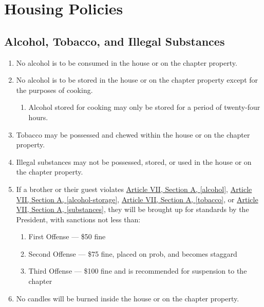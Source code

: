\chapter{Housing Policies}

\section{Alcohol, Tobacco, and Illegal Substances}

	\begin{enumerate}
		\item No alcohol is to be consumed in the house or on the chapter property. \label{alcohol}

		\item No alcohol is to be stored in the house or on the chapter property except for the purposes of cooking. \label{alcohol-storage}
			\begin{enumerate}
				\item Alcohol stored for cooking may only be stored for a period of twenty-four hours.
			\end{enumerate}

		\item Tobacco may be possessed and chewed within the house or on the chapter property. \label{tobacco} 

		\item Illegal substances may not be possessed, stored, or used in the house or on the chapter property. \label{substances}

		\item If a brother or their guest violates \hyperref[alcohol]{Article VII, Section A, \autoref*{alcohol}}, \hyperref[alcohol-storage]{Article VII, Section A, \autoref*{alcohol-storage}}, \hyperref[tobacco]{Article VII, Section A, \autoref*{tobacco}}, or \hyperref[substances]{Article VII, Section A, \autoref*{substances}}, they will be brought up for standards by the President, with sanctions not less than: 
			\begin{enumerate}
				\item First Offense --- \$50 fine
				\item Second Offense --- \$75 fine, placed on \gls{prob}, and becomes \gls{staggard}
				\item Third Offense --- \$100 fine and is recommended for suspension to the chapter
			\end{enumerate} 
		
		\item No candles will be burned inside the house or on the chapter property. 


\end{enumerate}
